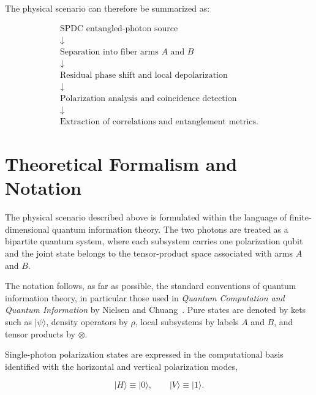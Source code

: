 \medskip

The physical scenario can therefore be summarized as:

\[
\begin{array}{c}
\text{SPDC entangled-photon source} \\
\downarrow \\
\text{Separation into fiber arms } A \text{ and } B \\
\downarrow \\
\text{Residual phase shift and local depolarization} \\
\downarrow \\
\text{Polarization analysis and coincidence detection} \\
\downarrow \\
\text{Extraction of correlations and entanglement metrics}.
\end{array}
\]


\section{Theoretical Formalism and Notation}

The physical scenario described above is formulated within the language of finite-dimensional quantum information theory. The two photons are treated as a bipartite quantum system, where each subsystem carries one polarization qubit and the joint state belongs to the tensor-product space associated with arms \( A \) and \( B \).

\medskip

The notation follows, as far as possible, the standard conventions of quantum information theory, in particular those used in \textit{Quantum Computation and Quantum Information} by Nielsen and Chuang~\cite{nielsen_chuang_qcqi}. Pure states are denoted by kets such as \( |\psi\rangle \), density operators by \( \rho \), local subsystems by labels \( A \) and \( B \), and tensor products by \( \otimes \).

\medskip

Single-photon polarization states are expressed in the computational basis identified with the horizontal and vertical polarization modes,

\[
|H\rangle \equiv |0\rangle,
\qquad
|V\rangle \equiv |1\rangle .
\]

